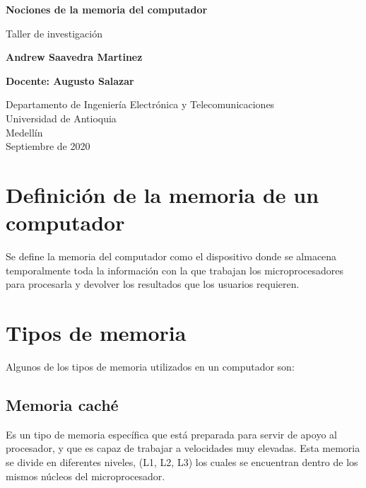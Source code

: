 \documentclass{article}
\begin{document}
\begin{titlepage}
    \begin{center}
        \vspace*{1cm}
            
        \Huge
        \textbf{Nociones de la memoria del computador}
            
        \vspace{0.5cm}
        \LARGE
        Taller de investigación
            
        \vspace{1.5cm}
            
        \textbf{Andrew Saavedra Martinez}
        
        \vspace{1.5cm}
            
        \textbf{Docente: Augusto Salazar}
        
        \vfill
            
        \vspace{0.8cm}
            
        \Large
        Departamento de Ingeniería Electrónica y Telecomunicaciones\\
        Universidad de Antioquia\\
        Medellín\\
        Septiembre de 2020
            
    \end{center}
\end{titlepage}

\tableofcontents
\newpage
\section{Definición de la memoria de un computador}\label{intro}
Se define la memoria del computador como el dispositivo donde se almacena temporalmente toda la información con la que trabajan los microprocesadores para procesarla y devolver los resultados que los usuarios requieren.\cite{youbioit.com}

\section{Tipos de memoria} \label{contenido}
Algunos de los tipos de memoria utilizados en un computador son:
\subsection{Memoria caché}
Es un tipo de memoria específica que está preparada para servir de apoyo al procesador, y que es capaz de trabajar a velocidades muy elevadas.  \cite{stallings2006organizacion} Esta memoria se divide en diferentes niveles, (L1, L2, L3) los cuales se encuentran dentro de los mismos núcleos del microprocesador.
\end{document}
